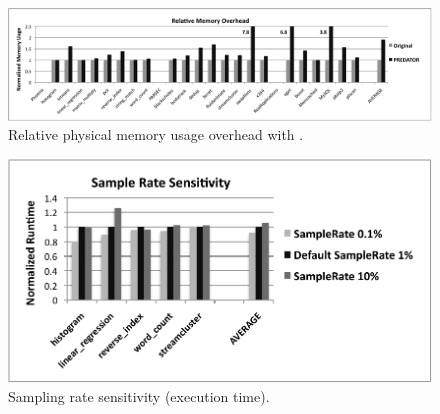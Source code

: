 \begin{figure}[!t]
\centering
\includegraphics[width=6in]{predator/figure/memusage}
\caption{Relative physical memory usage overhead with \Predator{}.}
\label{fig:memusage}
\end{figure}

\begin{figure}[!t]
\centering
\includegraphics[width=6in]{predator/figure/sample}
\caption{Sampling rate sensitivity (execution time).}
\label{fig:predatorsample}
\end{figure}


